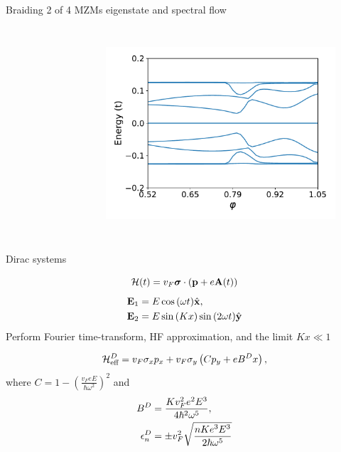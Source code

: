 \documentclass[xcolor=dvipsnames,10pt,aspectratio=169]{beamer}
\let\oldhat\hat
\renewcommand{\hat}[1]{\oldhat{\mathbf{#1}}}
\renewcommand{\vec}[1]{\mathbf{#1}}
\newcommand{\ham}{\mathcal{H}}
\begin{document}
\begin{frame}{Braiding 2 of 4 MZMs eigenstate and spectral flow}
\begin{columns}
\begin{figure}
      \end{figure}
      \begin{figure}
        {\includegraphics[width=1.1\textwidth]{./figures/spectral-flow-braiding.pdf}} \\
      \end{figure}
    \end{columns}
  \end{frame}

  \begin{frame}{Dirac systems}

    \begin{equation}
      \small
      \ham (t) = v_F \bm{\sigma} \cdot \left(\vec{p} + e \vec{A}(t)\right)
    \end{equation}
    \begin{align}
      \small
      \vec{E}_1 &= E\cos{(\omega t)} \hat{x}, \nonumber \\
      \vec{E}_2 &= E\sin{(Kx)}\sin{(2\omega t)} \hat{y}
    \end{align}
    Perform Fourier time-transform, HF approximation, and the limit $Kx\ll1$

    \begin{equation}
      \small
      \ham_{\text{eff}}^{D} = v_F \sigma_x p_x + v_F \sigma_y \left( C p_y + eB^Dx \right),
    \end{equation}
    where $C = 1 - {\left(\tfrac{v_F eE}{\hbar \omega^2}\right)}^2$ and
    \begin{align}
      \small
      B^{D} &= \frac{K v_F^2 e^2 E^3}{4\hbar^2 \omega^5}, \\
      \epsilon_n^{D} &= \pm v_F^2 \sqrt{ \dfrac{n K e^3 E^3}{2 \hbar \omega^5} }
    \end{align}


  \end{frame}
\end{document}
